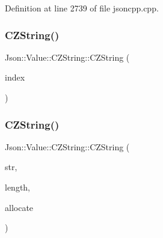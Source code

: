 Definition at line 2739 of file jsoncpp.\+cpp.

\hypertarget{class_json_1_1_value_1_1_c_z_string_a4b8aa6eaabdec78cffec96e088da996f}{}\label{class_json_1_1_value_1_1_c_z_string_a4b8aa6eaabdec78cffec96e088da996f} 
\subsubsection{\texorpdfstring{C\+Z\+String()}{CZString()}\hspace{0.1cm}{\footnotesize\ttfamily [4/6]}}
{\footnotesize\ttfamily Json\+::\+Value\+::\+C\+Z\+String\+::\+C\+Z\+String (\begin{DoxyParamCaption}\item[{\hyperlink{class_json_1_1_value_a184a91566cccca7b819240f0d5561c7d}{Array\+Index}}]{index }\end{DoxyParamCaption})}

\hypertarget{class_json_1_1_value_1_1_c_z_string_a86a86eaf0cf26d4c861d0daa359d608a}{}\label{class_json_1_1_value_1_1_c_z_string_a86a86eaf0cf26d4c861d0daa359d608a} 
\subsubsection{\texorpdfstring{C\+Z\+String()}{CZString()}\hspace{0.1cm}{\footnotesize\ttfamily [5/6]}}
{\footnotesize\ttfamily Json\+::\+Value\+::\+C\+Z\+String\+::\+C\+Z\+String (\begin{DoxyParamCaption}\item[{char const $\ast$}]{str,  }\item[{unsigned}]{length,  }\item[{\hyperlink{class_json_1_1_value_1_1_c_z_string_a2805c46fb4a72bbaed55de6d75941b6d}{Duplication\+Policy}}]{allocate }\end{DoxyParamCaption})}

\hypertarget{class_json_1_1_value_1_1_c_z_string_a9685070d440335b55ef5c85747d25157}{}\label{class_json_1_1_value_1_1_c_z_string_a9685070d440335b55ef5c85747d25157} 
